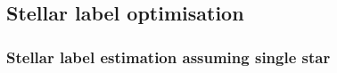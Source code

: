 \documentclass[
  journal=pasa,
  manuscript=research-paper, %
  year=2021,
  volume=37
]{cup-journal}
\newcommand{\SB}[1]{{\textcolor{purple}{#1}}}
\newcommand{\Teff}{$T_\mathrm{eff}$\xspace}
\newcommand{\logg}{$\log g$\xspace}
\newcommand{\feh}{$\mathrm{[Fe/H]}$\xspace}
\newcommand{\vrad}{$v_\mathrm{rad}$\xspace}
\newcommand{\TheCannon}{\textit{The Cannon}\xspace}
\newcommand{\TLF}{\Teff, \logg, and \feh}
\newcommand{\dex}{\,\mathrm{dex}}	%
\newcommand{\K}{\,\mathrm{K}}	%
\begin{document}








\subsection{Stellar label optimisation}
\label{sec:stellar_label_optimissation}

\subsubsection{Stellar label estimation assuming single star}
\label{sec:stellar_label_estimation_assuming_single_star}
\end{document}
